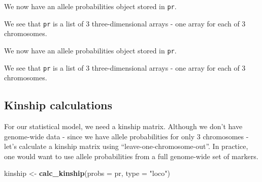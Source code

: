 \documentclass[oneside]{book}\usepackage[]{graphicx}\usepackage[]{color}
\newenvironment{Shaded}{\begin{snugshade}}{\end{snugshade}}
\newcommand{\CommentTok}[1]{\textcolor[rgb]{0.56,0.35,0.01}{\textit{#1}}}
\newcommand{\DataTypeTok}[1]{\textcolor[rgb]{0.13,0.29,0.53}{#1}}
\newcommand{\KeywordTok}[1]{\textcolor[rgb]{0.13,0.29,0.53}{\textbf{#1}}}
\newcommand{\NormalTok}[1]{#1}
\newcommand{\OperatorTok}[1]{\textcolor[rgb]{0.81,0.36,0.00}{\textbf{#1}}}
\newcommand{\StringTok}[1]{\textcolor[rgb]{0.31,0.60,0.02}{#1}}
\begin{document}
We now have an allele probabilities object stored in \texttt{pr}.

\begin{Shaded}
\end{Shaded}

We see that \texttt{pr} is a list of 3 three-dimensional arrays - one
array for each of 3 chromosomes.

We now have an allele probabilities object stored in \texttt{pr}.

\begin{Shaded}
\end{Shaded}

We see that \texttt{pr} is a list of 3 three-dimensional arrays - one
array for each of 3 chromosomes.

\hypertarget{kinship-calculations}{%
\subsection{Kinship calculations}\label{kinship-calculations}}

For our statistical model, we need a kinship matrix. Although we don't
have genome-wide data - since we have allele probabilities for only 3
chromosomes - let's calculate a kinship matrix using
``leave-one-chromosome-out''. In practice, one would want to use allele
probabilities from a full genome-wide set of markers.

\begin{Shaded}
\begin{Highlighting}[]
\NormalTok{kinship <-}\StringTok{ }\KeywordTok{calc_kinship}\NormalTok{(}\DataTypeTok{probs =}\NormalTok{ pr, }\DataTypeTok{type =} \StringTok{"loco"}\NormalTok{)}
\end{Highlighting}
\end{Shaded}
\end{document}
